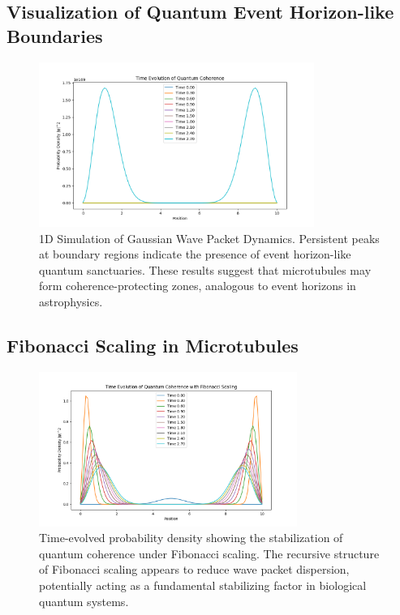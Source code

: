 \documentclass[entropy,article,submit,oneauthor,pdftex]{Definitions/mdpi}
\begin{document}
\subsection{Visualization of Quantum Event Horizon-like Boundaries}
\begin{figure}[H]
    \centering
    \includegraphics[width=0.8\textwidth]{figures/quantum_coherence_evolution.png}
    \caption{1D Simulation of Gaussian Wave Packet Dynamics. Persistent peaks at boundary regions indicate the presence of event horizon-like quantum sanctuaries. These results suggest that microtubules may form coherence-protecting zones, analogous to event horizons in astrophysics.}
    \label{fig:event_horizon}
\end{figure}

\subsection{Fibonacci Scaling in Microtubules}
\begin{figure}[H]
    \centering
    \includegraphics[width=0.75\textwidth]{figures/fibonacci_wavefunction_evoluation.png}
    \caption{Time-evolved probability density showing the stabilization of quantum coherence under Fibonacci scaling. The recursive structure of Fibonacci scaling appears to reduce wave packet dispersion, potentially acting as a fundamental stabilizing factor in biological quantum systems.}
    \label{fig:fibonacci_scaling}
\end{figure}
\end{document}
